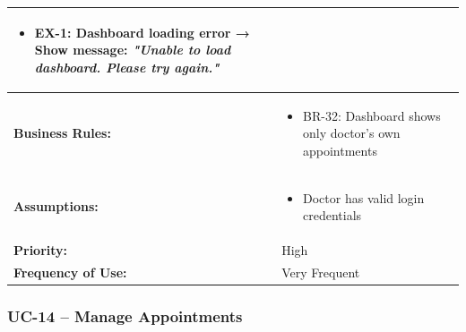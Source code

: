 \documentclass[12pt,a4paper]{article}
\begin{document}
\begin{longtable}{|p{4.5cm}|p{10.5cm}|}
\begin{itemize}
  \item EX-1: Dashboard loading error → Show message: \textit{"Unable to load dashboard. Please try again."}
\end{itemize} \\
\hline
\textbf{Business Rules:} &
\begin{itemize}
  \item BR-32: Dashboard shows only doctor's own appointments
\end{itemize} \\
\hline
\textbf{Assumptions:} &
\begin{itemize}
  \item Doctor has valid login credentials
\end{itemize} \\
\hline
\textbf{Priority:} & High \\
\hline
\textbf{Frequency of Use:} & Very Frequent \\
\hline
\end{longtable}

\subsubsection{UC-14 – Manage Appointments}
\end{document}

